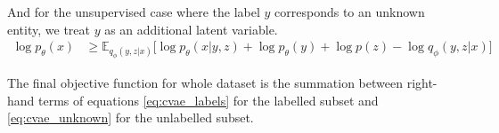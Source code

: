 And for the unsupervised case where the label $y$ corresponds to an unknown entity, we treat $y$ as an additional latent variable.
\begin{align}
  \label{eq:cvae_unknown}
  \log p_\theta(x) &\geq \mathbb{E}_{q_\phi(y,z|x)} \bigg[\log p_\theta(x|y,z) + \log p_\theta(y) + \log p(z) - \log q_\phi(y,z|x)\bigg]
\end{align}

The final objective function for whole dataset is the summation between right-hand terms of equations \ref{eq:cvae_labels} for the labelled subset and \ref{eq:cvae_unknown} for the unlabelled subset.
